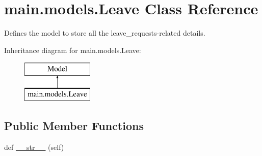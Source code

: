 \hypertarget{classmain_1_1models_1_1Leave}{}\section{main.\+models.\+Leave Class Reference}
\label{classmain_1_1models_1_1Leave}


Defines the model to store all the leave\+\_\+requests-\/related details.  


Inheritance diagram for main.\+models.\+Leave\+:\begin{figure}[H]
\begin{center}
\leavevmode
\includegraphics[height=2.000000cm]{classmain_1_1models_1_1Leave}
\end{center}
\end{figure}
\subsection*{Public Member Functions}
\begin{DoxyCompactItemize}
\item 
def \hyperlink{classmain_1_1models_1_1Leave_a79313821dfa94be8abab7a134808b972}{\+\_\+\+\_\+str\+\_\+\+\_\+} (self)
\end{DoxyCompactItemize}
